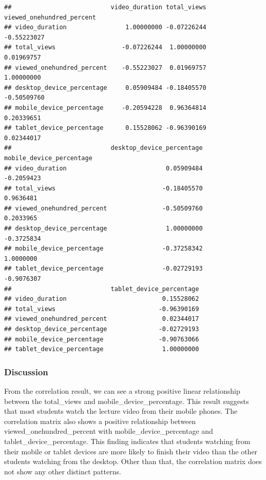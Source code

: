 \documentclass[12pt,]{article}
\begin{document}
\begin{verbatim}
##                           video_duration total_views viewed_onehundred_percent
## video_duration                1.00000000 -0.07226244               -0.55223027
## total_views                  -0.07226244  1.00000000                0.01969757
## viewed_onehundred_percent    -0.55223027  0.01969757                1.00000000
## desktop_device_percentage     0.05909484 -0.18405570               -0.50509760
## mobile_device_percentage     -0.20594228  0.96364814                0.20339651
## tablet_device_percentage      0.15528062 -0.96390169                0.02344017
##                           desktop_device_percentage mobile_device_percentage
## video_duration                           0.05909484               -0.2059423
## total_views                             -0.18405570                0.9636481
## viewed_onehundred_percent               -0.50509760                0.2033965
## desktop_device_percentage                1.00000000               -0.3725834
## mobile_device_percentage                -0.37258342                1.0000000
## tablet_device_percentage                -0.02729193               -0.9076307
##                           tablet_device_percentage
## video_duration                          0.15528062
## total_views                            -0.96390169
## viewed_onehundred_percent               0.02344017
## desktop_device_percentage              -0.02729193
## mobile_device_percentage               -0.90763066
## tablet_device_percentage                1.00000000
\end{verbatim}

\normalsize

\hypertarget{discussion-3}{%
\subsubsection{Discussion}\label{discussion-3}}

From the correlation result, we can see a strong positive linear
relationship between the total\_views and mobile\_device\_percentage.
This result suggests that most students watch the lecture video from
their mobile phones. The correlation matrix also shows a positive
relationship between viewed\_onehundred\_percent with
mobile\_device\_percentage and tablet\_device\_percentage. This finding
indicates that students watching from their mobile or tablet devices are
more likely to finish their video than the other students watching from
the desktop. Other than that, the correlation matrix does not show any
other distinct patterns.
\end{document}
